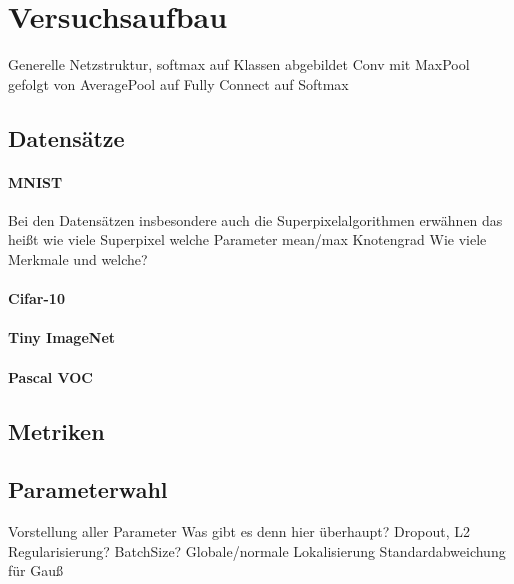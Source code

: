 \section{Versuchsaufbau}
\label{versuchsaufbau}

Generelle Netzstruktur, softmax auf Klassen abgebildet
Conv mit MaxPool gefolgt von AveragePool auf Fully Connect auf Softmax

\subsection{Datensätze}
\label{datensaetze}

\paragraph{MNIST}
\label{MNIST}

Bei den Datensätzen insbesondere auch die Superpixelalgorithmen erwähnen
das heißt wie viele Superpixel
welche Parameter
mean/max Knotengrad
Wie viele Merkmale und welche?

\cite{mnist}

\paragraph{Cifar-10}
\label{cifar_10}

\cite{cifar_10}

\paragraph{Tiny ImageNet}
\label{tiny_image_net}

\cite{imagenet}

\paragraph{Pascal VOC}
\label{pascal_voc}

\cite{pascal_voc}

\subsection{Metriken}
\label{metriken}

\subsection{Parameterwahl}
\label{parameterwahl}

Vorstellung aller Parameter
Was gibt es denn hier überhaupt?
Dropout, L2 Regularisierung?
BatchSize?
Globale/normale Lokalisierung
Standardabweichung für Gauß

